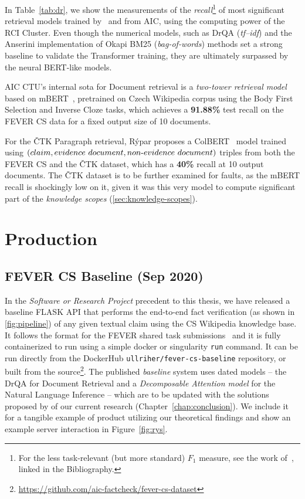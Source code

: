 In Table~\ref{tab:dr}, we show the measurements of the \textit{recall}\footnote{For the less task-relevant (but more standard) $F_1$ measure, see the work of~\cite{rypar}, linked in the Bibliography.} of most significant retrieval models trained by~\cite{rypar} and \cite{michal} from \textsf{AIC}, using the computing power of the \textsf{RCI Cluster}. Even though the numerical models, such as \textsf{DrQA} (\textit{tf--idf}) and the \textsf{Anserini} implementation of \textsf{Okapi BM25} (\textit{bag-of-words})  methods set a strong baseline to validate the Transformer training, they are ultimately surpassed by the neural \textsf{BERT}-like models.


\textsf{AIC CTU}'s internal sota for Document retrieval is a \textit{two-tower retrieval model}~\cite{twotower} based on \textsf{mBERT}~\cite{devlin2019bert}, pretrained on Czech \textsf{Wikipedia} corpus using the Body First Selection and Inverse Cloze tasks, which achieves a \textbf{91.88\%} test recall on the \textsf{FEVER CS} data for a fixed output size of 10 documents.

For the \textsf{ČTK Paragraph} retrieval, Rýpar proposes a \textsf{ColBERT}~\cite{colbert} model trained using $(claim,evidence~document,non{\text -}evidence~document)$ triples from both the \textsf{FEVER CS} and the \textsf{ČTK} dataset, which has a \textbf{40\%} recall at 10 output documents. The \textsf{ČTK} dataset is to be further examined for faults, as the \textsf{mBERT} recall is shockingly low on it, given it was this very model to compute significant part of the \textit{knowledge scopes} (\ref{sec:knowledge-scopes}).

\section{Production}
\subsection[FEVER CS Baseline]{FEVER CS Baseline (Sep 2020)}

In the \textit{Software or Research Project} precedent to this thesis, we have released a baseline \textsf{FLASK} \textsf{API} that performs the end-to-end fact verification (as shown in \ref{fig:pipeline}) of any given textual claim using the \textsf{CS Wikipedia} knowledge base. It follows the format for the \textsf{FEVER} shared task submissions~\cite{fever1} and it is fully containerized to run using a simple \textsf{docker} or \textsf{singularity} \texttt{run} command. It can be run directly from the \textsf{DockerHub}  \texttt{ullriher/fever-cs-baseline} repository, or built from the source\footnote{\url{https://github.com/aic-factcheck/fever-cs-dataset}}. The published \textit{baseline} system uses dated models -- the \textsf{DrQA} for Document Retrieval and a \textit{Decomposable Attention model} for the Natural Language Inference -- which are to be updated with the solutions proposed by of our current research (Chapter~\ref{chap:conclusion}). We include it for a tangible example of product utilizing our theoretical findings and show an example server interaction in Figure~\ref{fig:rys}.

